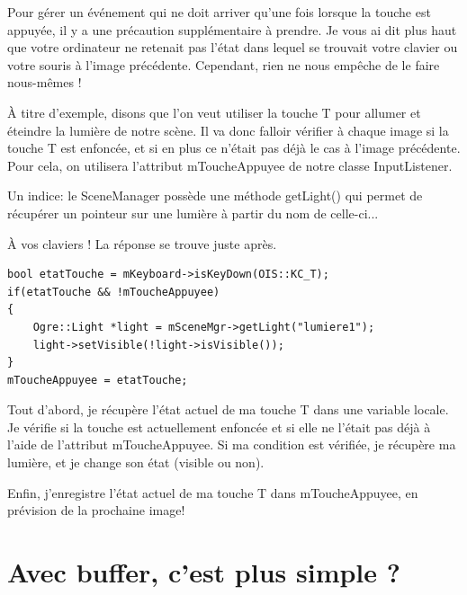 \documentclass[10pt,a4paper]{report}
\begin{document}
Pour g\'erer un \'ev\'enement qui ne doit arriver qu'une fois lorsque la touche est appuy\'ee, il y a une pr\'ecaution suppl\'ementaire \`a prendre. Je vous ai dit plus haut que votre ordinateur ne retenait pas l'\'etat dans lequel se trouvait votre clavier ou votre souris \`a l'image pr\'ec\'edente. Cependant, rien ne nous emp\^eche de le faire nous-m\^emes !

\`A titre d'exemple, disons que l'on veut utiliser la touche T pour allumer et \'eteindre la lumi\`ere de notre sc\`ene. Il va donc falloir v\'erifier \`a chaque image si la touche T est enfonc\'ee, et si en plus ce n'\'etait pas d\'ej\`a le cas \`a l'image pr\'ec\'edente. Pour cela, on utilisera l'attribut mToucheAppuyee de notre classe InputListener.

Un indice: le SceneManager poss\`ede une m\'ethode getLight() qui permet de r\'ecup\'erer un pointeur sur une lumi\`ere \`a partir du nom de celle-ci...

\`A vos claviers ! La r\'eponse se trouve juste apr\`es.



\begin{lstlisting}[caption={Capture de l'\'etat ponctuel d'une touche}]
bool etatTouche = mKeyboard->isKeyDown(OIS::KC_T);
if(etatTouche && !mToucheAppuyee)
{
    Ogre::Light *light = mSceneMgr->getLight("lumiere1");
    light->setVisible(!light->isVisible());
}
mToucheAppuyee = etatTouche;
\end{lstlisting}





Tout d'abord, je r\'ecup\`ere l'\'etat actuel de ma touche T dans une variable locale. Je v\'erifie si la touche est actuellement enfonc\'ee et si elle ne l'\'etait pas d\'ej\`a \`a l'aide de l'attribut mToucheAppuyee. Si ma condition est v\'erifi\'ee, je r\'ecup\`ere ma lumi\`ere, et je change son \'etat (visible ou non).

Enfin, j'enregistre l'\'etat actuel de ma touche T dans mToucheAppuyee, en pr\'evision de la prochaine image!






\section{Avec buffer, c'est plus simple ?}
\end{document}
